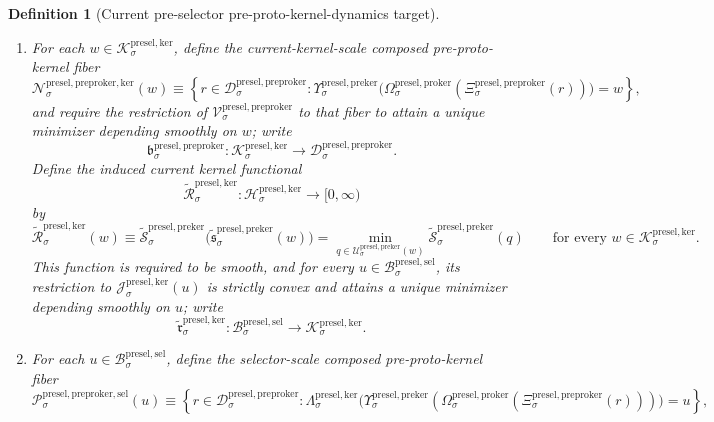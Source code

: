 \documentclass[11pt]{article}
\newcommand{\PreSectionSelectorBody}[1]{\mathcal B_{#1}^{\mathrm{presel,sel}}}
\newcommand{\KernelSpace}[1]{\mathcal H_{#1}^{\mathrm{presel,ker}}}
\newcommand{\KernelBody}[1]{\mathcal K_{#1}^{\mathrm{presel,ker}}}
\newcommand{\KernelProj}[1]{\Lambda_{#1}^{\mathrm{presel,ker}}}
\newcommand{\KernelFiber}[2]{\mathcal J_{#1}^{\mathrm{presel,ker}}(#2)}
\newcommand{\PreKernelSpace}[1]{\mathcal N_{#1}^{\mathrm{presel,preker}}}
\newcommand{\PreKernelBody}[1]{\mathcal P_{#1}^{\mathrm{presel,preker}}}
\newcommand{\PreKernelProj}[1]{\Upsilon_{#1}^{\mathrm{presel,preker}}}
\newcommand{\PreKernelFiber}[2]{\mathcal U_{#1}^{\mathrm{presel,preker}}(#2)}
\newcommand{\ProtoKernelProj}[1]{\Omega_{#1}^{\mathrm{presel,proker}}}
\newcommand{\ProtoKernelFiber}[2]{\mathcal X_{#1}^{\mathrm{presel,proker}}(#2)}
\newcommand{\PreProtoKernelBody}[1]{\mathcal D_{#1}^{\mathrm{presel,preproker}}}
\newcommand{\PreProtoKernelProj}[1]{\Xi_{#1}^{\mathrm{presel,preproker}}}
\newcommand{\PreProtoKernelFunctional}[1]{\mathscr V_{#1}^{\mathrm{presel,preproker}}}
\newcommand{\PreProtoKernelKernelFiber}[2]{\mathcal N_{#1}^{\mathrm{presel,preproker,ker}}(#2)}
\newcommand{\PreProtoKernelKernelMin}[1]{\mathfrak b_{#1}^{\mathrm{presel,preproker}}}
\newcommand{\PreProtoKernelSelectorFiber}[2]{\mathcal P_{#1}^{\mathrm{presel,preproker,sel}}(#2)}
\newcommand{\InducedKernelFunctional}[1]{\widetilde{\mathscr R}_{#1}^{\mathrm{presel,ker}}}
\newcommand{\InducedKernelMinLift}[1]{\widetilde{\mathfrak r}_{#1}^{\mathrm{presel,ker}}}
\newcommand{\InducedPreKernelFunctional}[1]{\widetilde{\mathscr S}_{#1}^{\mathrm{presel,preker}}}
\newcommand{\InducedPreKernelMinLift}[1]{\widetilde{\mathfrak s}_{#1}^{\mathrm{presel,preker}}}
\newcommand{\InducedProtoKernelFunctional}[1]{\widetilde{\mathscr U}_{#1}^{\mathrm{presel,proker}}}
\newcommand{\InducedProtoKernelMinLift}[1]{\widetilde{\mathfrak v}_{#1}^{\mathrm{presel,proker}}}
\newtheorem{definition}{Definition}
\begin{document}
\begin{definition}[Current pre-selector pre-proto-kernel-dynamics target]
\begin{enumerate}
\[    \]
    Define the induced current pre-kernel functional
    \[
    \InducedPreKernelFunctional{\sigma}:\PreKernelSpace{\sigma}\to[0,\infty)
    \]
    by
    \[
    \InducedPreKernelFunctional{\sigma}(q)
    \equiv
    \InducedProtoKernelFunctional{\sigma}\bigl(\InducedProtoKernelMinLift{\sigma}(q)\bigr)
    =
    \min_{z\in\ProtoKernelFiber{\sigma}{q}}
    \InducedProtoKernelFunctional{\sigma}(z)
    \qquad
    \text{for every }
    q\in\PreKernelBody{\sigma}.
    \]
    This function is required to be smooth, and for every \(w\in\KernelBody{\sigma}\), its restriction to \(\PreKernelFiber{\sigma}{w}\) is strictly convex and attains a unique minimizer depending smoothly on \(w\); write
    \[
    \InducedPreKernelMinLift{\sigma}:\KernelBody{\sigma}\to\PreKernelBody{\sigma}.
    \]
    \item For each \(w\in\KernelBody{\sigma}\), define the current-kernel-scale composed pre-proto-kernel fiber
    \[
    \PreProtoKernelKernelFiber{\sigma}{w}
    \equiv
    \left\{
    r\in\PreProtoKernelBody{\sigma}:
    \PreKernelProj{\sigma}\bigl(\ProtoKernelProj{\sigma}(\PreProtoKernelProj{\sigma}(r))\bigr)=w
    \right\},
    \]
    and require the restriction of \(\PreProtoKernelFunctional{\sigma}\) to that fiber to attain a unique minimizer depending smoothly on \(w\); write
    \[
    \PreProtoKernelKernelMin{\sigma}:\KernelBody{\sigma}\to\PreProtoKernelBody{\sigma}.
    \]
    Define the induced current kernel functional
    \[
    \InducedKernelFunctional{\sigma}:\KernelSpace{\sigma}\to[0,\infty)
    \]
    by
    \[
    \InducedKernelFunctional{\sigma}(w)
    \equiv
    \InducedPreKernelFunctional{\sigma}\bigl(\InducedPreKernelMinLift{\sigma}(w)\bigr)
    =
    \min_{q\in\PreKernelFiber{\sigma}{w}}
    \InducedPreKernelFunctional{\sigma}(q)
    \qquad
    \text{for every }
    w\in\KernelBody{\sigma}.
    \]
    This function is required to be smooth, and for every \(u\in\PreSectionSelectorBody{\sigma}\), its restriction to \(\KernelFiber{\sigma}{u}\) is strictly convex and attains a unique minimizer depending smoothly on \(u\); write
    \[
    \InducedKernelMinLift{\sigma}:\PreSectionSelectorBody{\sigma}\to\KernelBody{\sigma}.
    \]
    \item For each \(u\in\PreSectionSelectorBody{\sigma}\), define the selector-scale composed pre-proto-kernel fiber
    \[
    \PreProtoKernelSelectorFiber{\sigma}{u}
    \equiv
    \left\{
    r\in\PreProtoKernelBody{\sigma}:
    \KernelProj{\sigma}\bigl(\PreKernelProj{\sigma}(\ProtoKernelProj{\sigma}(\PreProtoKernelProj{\sigma}(r)))\bigr)=u
    \right\},
\]
\end{enumerate}
\end{definition}
\end{document}
